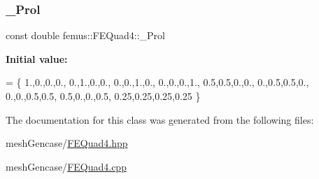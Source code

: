 \subsubsection{\texorpdfstring{\+\_\+\+Prol}{\_Prol}}
{\footnotesize\ttfamily const double femus\+::\+F\+E\+Quad4\+::\+\_\+\+Prol\hspace{0.3cm}{\ttfamily [static]}}

{\bfseries Initial value\+:}
\begin{DoxyCode}
=  \{ 
   1.,0.,0.,0.,
   0.,1.,0.,0.,
   0.,0.,1.,0.,
   0.,0.,0.,1.,
   0.5,0.5,0.,0.,
   0.,0.5,0.5,0.,
   0.,0.,0.5,0.5,
   0.5,0.,0.,0.5,
   0.25,0.25,0.25,0.25
    \}
\end{DoxyCode}


The documentation for this class was generated from the following files\+:\begin{DoxyCompactItemize}
\item 
mesh\+Gencase/\mbox{\hyperlink{_f_e_quad4_8hpp}{F\+E\+Quad4.\+hpp}}\item 
mesh\+Gencase/\mbox{\hyperlink{_f_e_quad4_8cpp}{F\+E\+Quad4.\+cpp}}\end{DoxyCompactItemize}
